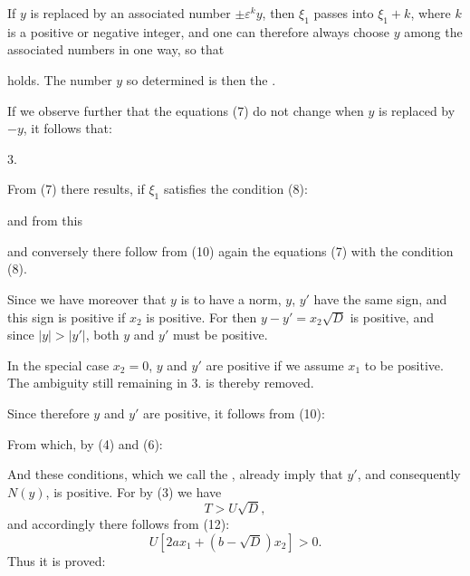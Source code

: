 
If $y$ is replaced by an associated number $\pm\varepsilon^k y$, then $\xi_1$
passes into $\xi_1 + k$, where $k$ is a positive or negative integer,
and one can therefore always choose $y$ among the associated numbers
in one way, so that


holds. The number $y$ so determined is then the .

If we observe further that the equations (7) do not change
when $y$ is replaced by $-y$, it follows that:

3. 

From (7) there results, if $\xi_1$ satisfies the condition (8):


and from this


and conversely there follow from (10) again the equations (7) with
the condition (8).

Since we have moreover  that $y$ is to have a 
norm, $y$, $y'$ have the same sign, and this sign
is positive if $x_2$ is positive. For then $y - y' = x_2\sqrt{D}$ is
positive, and since $|y| > |y'|$, both $y$ and $y'$ must be positive.

In the special case $x_2 = 0$, $y$ and $y'$ are positive if
we assume $x_1$ to be positive. The ambiguity still remaining
in 3. is thereby removed.

Since therefore $y$ and $y'$ are positive, it follows from (10):


From which, by (4) and (6):


And these conditions, which we call the ,
already imply that $y'$, and consequently
$N(y)$, is positive. For by (3) we have
\[
T > U\sqrt{D},
\]
and accordingly there follows from (12):
\[
U[2ax_1 + (b-\sqrt{D})x_2] > 0.
\]
Thus it is proved:

